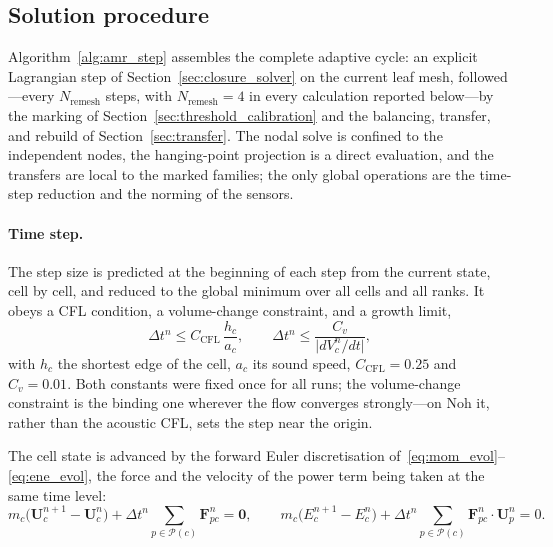 \documentclass[a4paper]{cas-sc}
\begin{document}
\subsection{Solution procedure}
\label{sec:procedure}

Algorithm~\ref{alg:amr_step} assembles the complete adaptive cycle: an explicit Lagrangian step of Section~\ref{sec:closure_solver} on the current leaf mesh, followed---every $N_{\mathrm{remesh}}$ steps, with $N_{\mathrm{remesh}}=4$ in every calculation reported below---by the marking of Section~\ref{sec:threshold_calibration} and the balancing, transfer, and rebuild of Section~\ref{sec:transfer}. The nodal solve is confined to the independent nodes, the hanging-point projection is a direct evaluation, and the transfers are local to the marked families; the only global operations are the time-step reduction and the norming of the sensors.

\paragraph{Time step.}
The step size is predicted at the beginning of each step from the current state, cell by cell, and reduced to the global minimum over all cells and all ranks. It obeys a CFL condition, a volume-change constraint, and a growth limit,
\begin{equation}
	\Delta t^n\le C_{\mathrm{CFL}}\,\frac{h_c}{a_c},
	\qquad
	\Delta t^n\le \frac{C_v}{\bigl|dV_c^n/dt\bigr|},
	\label{eq:cfl}
\end{equation}
with $h_c$ the shortest edge of the cell, $a_c$ its sound speed, $C_{\mathrm{CFL}}=0.25$ and $C_v=0.01$. Both constants were fixed once for all runs; the volume-change constraint is the binding one wherever the flow converges strongly---on Noh it, rather than the acoustic CFL, sets the step near the origin.

The cell state is advanced by the forward Euler discretisation of~\eqref{eq:mom_evol}--\eqref{eq:ene_evol}, the force and the velocity of the power term being taken at the same time level:
\begin{equation}
	m_c\bigl(\boldsymbol U_c^{n+1}-\boldsymbol U_c^n\bigr)+\Delta t^n\sum_{p\in\mathcal P(c)}\boldsymbol F_{pc}^n=\boldsymbol 0,
	\qquad
	m_c\bigl(E_c^{n+1}-E_c^n\bigr)+\Delta t^n\sum_{p\in\mathcal P(c)}\boldsymbol F_{pc}^n\cdot\boldsymbol U_p^n=0.
	\label{eq:fe_update}
\end{equation}
\end{document}
